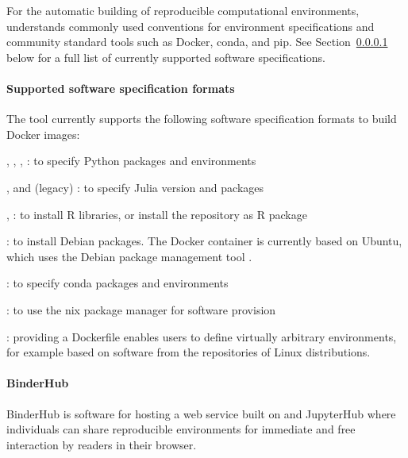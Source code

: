 For the automatic building of reproducible computational environments,
\repotodocker{} understands commonly used conventions for environment specifications and
community standard tools such as Docker, conda, and pip. See
Section~\ref{repo2docker-supported-software-specifications} below for a full list of
currently supported software specifications.

\paragraph{Supported software specification formats}
\label{repo2docker-supported-software-specifications}
The \repotodocker{} tool currently supports the following software specification
formats to build Docker images:
\begin{compactitem}
\item {}, ,
  , : to specify Python
  packages and environments
\item {},  and (legacy)
  : to
  specify Julia version and packages
\item {}, : to install R
  libraries, or install the repository as R package
\item {}: to install Debian packages. The Docker container
  is currently based on Ubuntu, which uses the Debian package management tool .
\item {}: to specify conda packages and
  environments
\item {}: to use the nix package manager for software provision
\item {}: providing a Dockerfile enables users to define
  virtually arbitrary environments, for example based on software from the
  repositories of Linux distributions.
\end{compactitem}

\paragraph{BinderHub}\label{sec:binderhub}
BinderHub is software for hosting a web service built on \repotodocker{} and
JupyterHub where individuals can share reproducible environments for
immediate and free interaction by readers in their browser.



